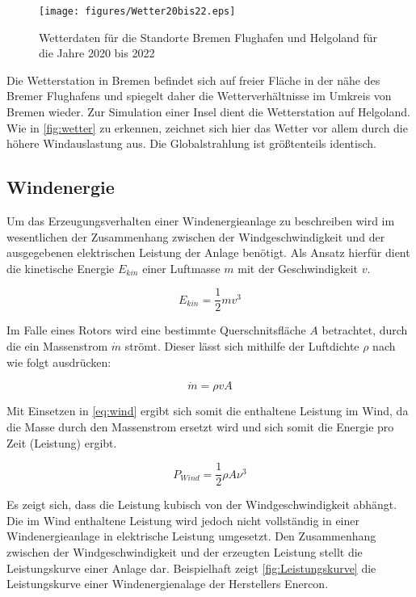 \begin{figure}[H]
	\centering
	\texttt{[image: figures/Wetter20bis22.eps]}
	\caption{Wetterdaten für die Standorte Bremen Flughafen und Helgoland für die Jahre 2020 bis 2022}
	\label{fig:wetter}
\end{figure}

Die Wetterstation in Bremen befindet sich auf freier Fläche in der nähe des Bremer Flughafens und spiegelt daher die Wetterverhältnisse im Umkreis von Bremen wieder. Zur Simulation einer Insel dient die Wetterstation auf Helgoland. Wie in \autoref{fig:wetter} zu erkennen, zeichnet sich hier das Wetter vor allem durch die höhere Windauslastung aus. Die Globalstrahlung ist größtenteils identisch.

\subsection{Windenergie}

Um das Erzeugungsverhalten einer Windenergieanlage zu beschreiben wird im wesentlichen der Zusammenhang zwischen der Windgeschwindigkeit und der ausgegebenen elektrischen Leistung der Anlage benötigt. Als Ansatz hierfür dient die kinetische Energie $E_{kin}$ einer Luftmasse $m$ mit der Geschwindigkeit $v$. \cite{Hau2016}

\begin{equation}
	E_{kin} = \frac{1}{2} mv^3
	\label{eq:wind}
\end{equation}

Im Falle eines Rotors wird eine bestimmte Querschnitsfläche $A$ betrachtet, durch die ein Massenstrom $\dot{m}$ strömt. Dieser lässt sich mithilfe der Luftdichte $\rho$ nach \cite{} wie folgt ausdrücken:

\begin{equation}
	\dot{m} = \rho vA
\end{equation}

Mit Einsetzen in \autoref{eq:wind} ergibt sich somit die enthaltene Leistung im Wind, da die Masse durch den Massenstrom ersetzt wird und sich somit die Energie pro Zeit (Leistung) ergibt.

\begin{equation}
	P_{Wind} = \frac{1}{2}\rho A \nu^3
\end{equation}

Es zeigt sich, dass die Leistung kubisch von der Windgeschwindigkeit abhängt. Die im Wind enthaltene Leistung wird jedoch nicht vollständig in einer Windenergieanlage in elektrische Leistung umgesetzt. Den Zusammenhang zwischen der Windgeschwindigkeit und der erzeugten Leistung stellt die Leistungskurve einer Anlage dar. Beispielhaft zeigt \autoref{fig:Leistungskurve} die Leistungskurve einer Windenergienalage der Herstellers Enercon. 

